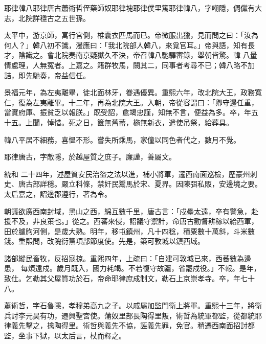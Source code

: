 
\begin{pinyinscope}

 耶律韓八耶律唐古蕭術哲侄藥師奴耶律塊耶律僕里篤耶律韓八，字嘲隱，倜儻有大志，北院詳穩古之五世孫。



 太平中，游京師，寓行宮側，椎囊衣匹馬而已。帝微服出獵，見而問之曰：「汝為何人？」韓八初不識，漫應曰：「我北院部人韓八，來覓官耳。」帝與語，知有長才，陰識之。會北院奏南京疑獄久不決，帝召韓八馳驛審錄，舉朝皆驚。韓
 八量情處理，人無冤者。上嘉之。籍群牧馬，闕其二，同事者考尋不已；韓八略不加詰，即先馳奏，帝益信任。



 景福元年，為左夷離畢，徙北面林牙，眷遇優異。重熙六年，改北院大王，政務寬仁，復為左夷離畢。十二年，再為北院大王。入朝，帝從容謂曰：「卿守邊任重，當實府庫、振貧乏以報朕。」既受詔，愈竭忠謹，知無不言，便益為多。卒，年五十五。上聞，悼惜。死之日，篋無舊蓄，椸無新衣，遣使吊祭，給葬具。



 韓八平居不細務，喜慍不形。嘗失所乘馬，家僮以同色者代之，數月不覺。



 耶律唐古，字敵隱，於越屋質之庶子。廉謹，善屬文。



 統和
 二十四年，述屋質安民治盜之法以進，補小將軍，遷西南面巡檢，歷豪州刺史、唐古部詳穩。嚴立科條，禁奸民鬻馬於宋、夏界。因陳弭私販，安邊境之要。太后嘉之，詔邊郡遵行，著為令。



 朝議欲廣西南封域，黑山之西，綿互數千里，唐古言：「戍壘太遠，卒有警急，赴援不及，非良策也。」從之。西蕃來侵，詔議守禦計，命唐古勸督耕稼以給西軍，田於臚朐河側，是歲大熟。明年，移屯鎮州，凡十四稔，積粟數十萬斜，斗米數錢。重熙問，改隗衍黨項部節度使。先是，築可敦城以鎮西域。



 諸部縱民畜牧，反招寇掠。重熙四年，上疏曰：「自建可敦城已來，西蕃數為邊患，
 每煩遠戍。歲月既入，國力耗竭。不若復守故疆，省罷戍役。」不報。是年，致仕。乞勒其父屋質功於石，帝命耶律庶成制文，勒石上京崇孝寺。卒，年七十八。



 蕭術哲，字石魯隱，孝穆弟高九之子。以戚屬加監門衛上將軍。重熙十三年，將衛兵討李元昊有功，遷興聖宮使。蒲奴里部長陶得里叛，術哲為統軍都監，從都統耶律義先擊之，擒陶得里。術哲與義先不協，誣義先罪，免官。稍遷西南面招討都監，坐事下獄，以太后言，杖而釋之。




\end{pinyinscope}
